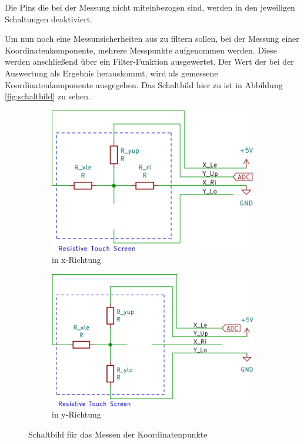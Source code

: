 Die Pins die bei der Messung nicht miteinbezogen sind, werden in den jeweiligen Schaltungen deaktiviert. 

Um nun noch eine Messunsicherheiten aus zu filtern sollen, bei der Messung einer Koordinatenkomponente, mehrere Messpunkte aufgenommen werden. 
Diese werden anschließend über ein Filter-Funktion ausgewertet. Der Wert der bei der Auswertung als Ergebnis herauskommt, wird als gemessene Koordinatenkomponente ausgegeben.
Das Schaltbild hier zu ist in Abbildung \ref{fig:schaltbild} zu sehen. 

\begin{figure}[ht!]
    \begin{subfigure}{0.49\textwidth}
        \centering
        \includegraphics[width=\textwidth]{fig/xlesen.png}
        \caption{in x-Richtung}
        \label{fig:xlesen}
    \end{subfigure}
    \hfill
    \begin{subfigure}{0.49\textwidth}
        \centering
        \includegraphics[width=\textwidth]{fig/ylesen.png}
        \caption{in y-Richtung}
        \label{fig:ylesen}
    \end{subfigure}
    \caption{Schaltbild für das Messen der Koordinatenpunkte}
    \label{fig:xylesen}
\end{figure}
